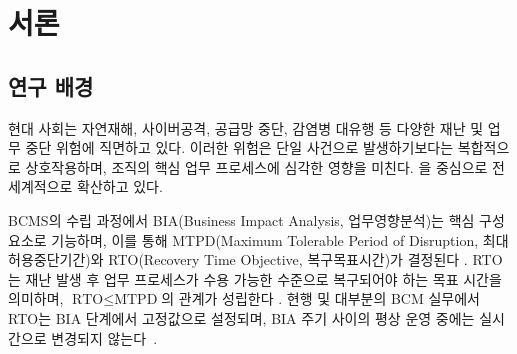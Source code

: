 
\chapter{서론}
\label{ch:introduction}

\section{연구 배경}
\label{sec:background}

현대 사회는 자연재해, 사이버공격, 공급망 중단, 감염병 대유행 등 다양한 재난 및
업무 중단 위험에 직면하고 있다. 이러한 위험은 단일 사건으로 발생하기보다는
복합적으로 상호작용하며, 조직의 핵심 업무 프로세스에 심각한 영향을 미친다.
 을 중심으로
전 세계적으로 확산하고 있다.

BCMS의 수립 과정에서 BIA(Business Impact Analysis, 업무영향분석)는 핵심
구성 요소로 기능하며, 이를 통해 MTPD(Maximum Tolerable
Period of Disruption, 최대허용중단기간)와 RTO(Recovery Time Objective, 복구목표시간)가 결정된다
\citep{hiles2010bcm, snedaker2013bcdr}.
RTO는 재난 발생 후 업무 프로세스가 수용 가능한 수준으로 복구되어야 하는
목표 시간을 의미하며, $\text{RTO} \leq \text{MTPD}$의 관계가 성립한다
.
현행  및 대부분의 BCM 실무에서 RTO는 BIA 단계에서 고정값으로
설정되며, BIA 주기 사이의 평상 운영 중에는 실시간으로 변경되지
않는다~\citep{herbane2010disaster}.

